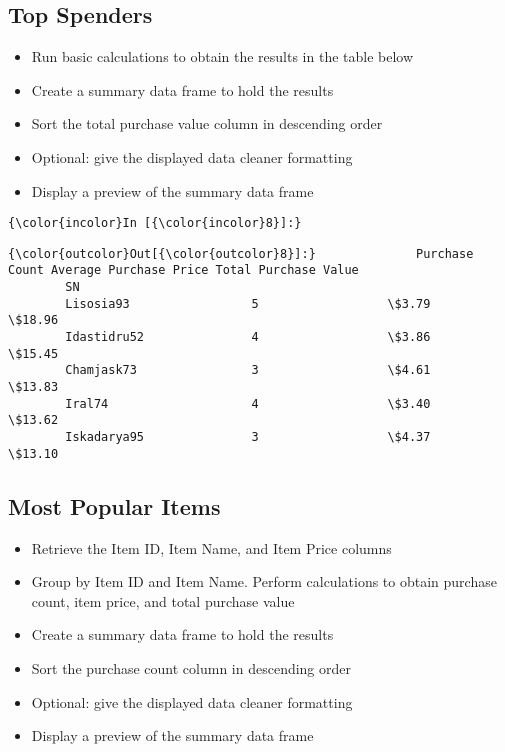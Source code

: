 \documentclass[11pt]{article}
\begin{document}
    \subsection{Top Spenders}\label{top-spenders}

    \begin{itemize}
\item
  Run basic calculations to obtain the results in the table below
\item
  Create a summary data frame to hold the results
\item
  Sort the total purchase value column in descending order
\item
  Optional: give the displayed data cleaner formatting
\item
  Display a preview of the summary data frame
\end{itemize}

    \begin{Verbatim}[commandchars=\\\{\}]
{\color{incolor}In [{\color{incolor}8}]:} 
\end{Verbatim}


\begin{Verbatim}[commandchars=\\\{\}]
{\color{outcolor}Out[{\color{outcolor}8}]:}              Purchase Count Average Purchase Price Total Purchase Value
        SN                                                                     
        Lisosia93                 5                  \$3.79               \$18.96
        Idastidru52               4                  \$3.86               \$15.45
        Chamjask73                3                  \$4.61               \$13.83
        Iral74                    4                  \$3.40               \$13.62
        Iskadarya95               3                  \$4.37               \$13.10
\end{Verbatim}
            
    \subsection{Most Popular Items}\label{most-popular-items}

    \begin{itemize}
\item
  Retrieve the Item ID, Item Name, and Item Price columns
\item
  Group by Item ID and Item Name. Perform calculations to obtain
  purchase count, item price, and total purchase value
\item
  Create a summary data frame to hold the results
\item
  Sort the purchase count column in descending order
\item
  Optional: give the displayed data cleaner formatting
\item
  Display a preview of the summary data frame
\end{itemize}
\end{document}

